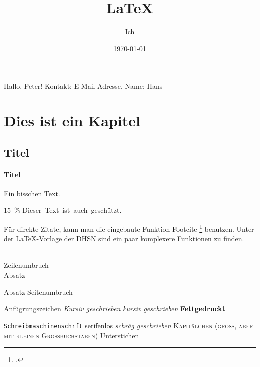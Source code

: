 \documentclass[a4paper, 12pt]{article}
\title{LaTeX}
\author{Ich}
\date{\today}
\newcommand{\gruss}[1]{Hallo, #1!}
\newcommand{\email}[2][E-Mail-Adresse]{Kontakt: #1, Name: #2}
\begin{document}
\gruss{Peter} %
\email{Hans} %

\maketitle
\tableofcontents %

\section{Dies ist ein Kapitel} %
\subsection{Titel} %
\paragraph{Titel} %


Ein bisschen Text.

15~\% %
\mbox{Dieser Text ist auch geschützt.}

Für direkte Zitate, kann man die eingebaute Funktion Footcite \footcite[2]{psgithub} benutzen.
Unter der LaTeX-Vorlage der DHSN sind ein paar komplexere Funktionen zu finden.

\\          Zeilenumbruch
\\[0,5cm]   Absatz
\par        Absatz
\newpage    Seitenumbruch

\glqq{}Anfügrungszeichen\grqq{}
\textit{Kursiv geschrieben}
\emph{kursiv geschrieben}
\textbf{Fettgedruckt}

\texttt{Schreibmaschinenschrft}
\textsf{serifenlos}
\textsl{schräg geschrieben}
\textsc{Kapitälchen (groß, aber mit kleinen Großbuchstaben)}
\underline{Unterstichen}
\end{document}
